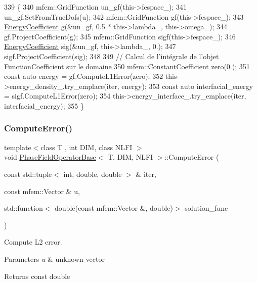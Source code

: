 \begin{DoxyCode}
339                                                                     \{
340   mfem::GridFunction un\_gf(this->fespace\_);
341   un\_gf.SetFromTrueDofs(u);
342   mfem::GridFunction gf(this->fespace\_);
343   \hyperlink{classEnergyCoefficient}{EnergyCoefficient} g(&un\_gf, 0.5 * this->lambda\_, this->omega\_);
344   gf.ProjectCoefficient(g);
345   mfem::GridFunction sigf(this->fespace\_);
346   \hyperlink{classEnergyCoefficient}{EnergyCoefficient} sig(&un\_gf, this->lambda\_, 0.);
347   sigf.ProjectCoefficient(sig);
348 
349   \textcolor{comment}{// Calcul de l'intégrale de l'objet FunctionCoefficient sur le domaine}
350   mfem::ConstantCoefficient zero(0.);
351   \textcolor{keyword}{const} \textcolor{keyword}{auto} energy = gf.ComputeL1Error(zero);
352   this->energy\_density\_.try\_emplace(iter, energy);
353   \textcolor{keyword}{const} \textcolor{keyword}{auto} interfacial\_energy = sigf.ComputeL1Error(zero);
354   this->energy\_interface\_.try\_emplace(iter, interfacial\_energy);
355 \}
\end{DoxyCode}
\mbox{\label{classPhaseFieldOperatorBase_ae2166b96b4d740e05c5dd1ca36e9fc8c}} 
\subsubsection{\texorpdfstring{Compute\+Error()}{ComputeError()}}
{\footnotesize\ttfamily template$<$class T , int D\+IM, class N\+L\+FI $>$ \\
void \hyperlink{classPhaseFieldOperatorBase}{Phase\+Field\+Operator\+Base}$<$ T, D\+IM, N\+L\+FI $>$\+::Compute\+Error (\begin{DoxyParamCaption}\item[{const std\+::tuple$<$ int, double, double $>$ \&}]{iter,  }\item[{const mfem\+::\+Vector \&}]{u,  }\item[{std\+::function$<$ double(const mfem\+::\+Vector \&, double)$>$}]{solution\+\_\+func }\end{DoxyParamCaption})\hspace{0.3cm}{\ttfamily [inherited]}}



Compute L2 error. 


\begin{DoxyParams}{Parameters}
{\em u} & unknown vector \\
\hline
\end{DoxyParams}
\begin{DoxyReturn}{Returns}
const double 
\end{DoxyReturn}


